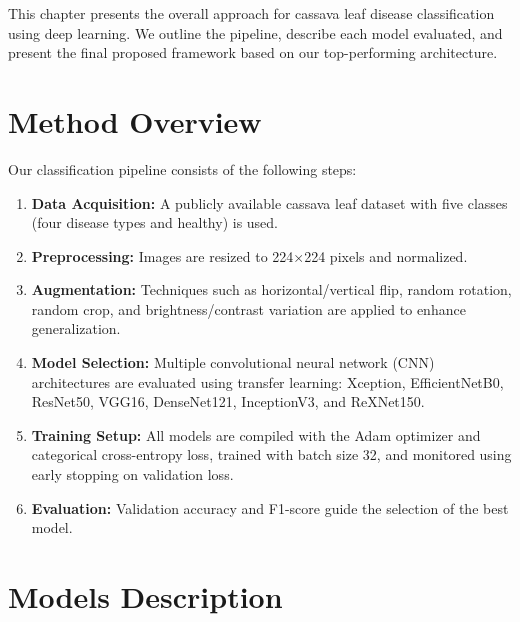 
This chapter presents the overall approach for cassava leaf disease classification using deep learning. We outline the pipeline, describe each model evaluated, and present the final proposed framework based on our top-performing architecture.

\section{Method Overview}

Our classification pipeline consists of the following steps:

\begin{enumerate}
    \item \textbf{Data Acquisition:} A publicly available cassava leaf dataset with five classes (four disease types and healthy) is used.
    \item \textbf{Preprocessing:} Images are resized to 224×224 pixels and normalized.
    \item \textbf{Augmentation:} Techniques such as horizontal/vertical flip, random rotation, random crop, and brightness/contrast variation are applied to enhance generalization.
    \item \textbf{Model Selection:} Multiple convolutional neural network (CNN) architectures are evaluated using transfer learning: Xception, EfficientNetB0, ResNet50, VGG16, DenseNet121, InceptionV3, and ReXNet150.
    \item \textbf{Training Setup:} All models are compiled with the Adam optimizer and categorical cross-entropy loss, trained with batch size 32, and monitored using early stopping on validation loss.
    \item \textbf{Evaluation:} Validation accuracy and F1-score guide the selection of the best model.
\end{enumerate}

\section{Models Description}

